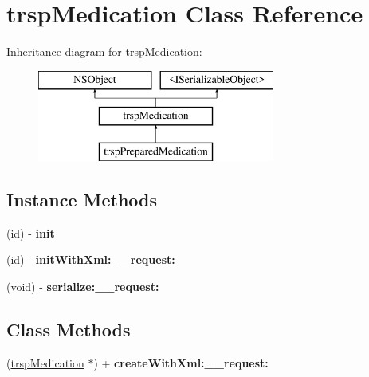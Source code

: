 \hypertarget{interfacetrsp_medication}{}\section{trsp\+Medication Class Reference}
\label{interfacetrsp_medication}
Inheritance diagram for trsp\+Medication\+:\begin{figure}[H]
\begin{center}
\leavevmode
\includegraphics[height=3.000000cm]{interfacetrsp_medication}
\end{center}
\end{figure}
\subsection*{Instance Methods}
\begin{DoxyCompactItemize}
\item 
\hypertarget{interfacetrsp_medication_a001b09d04623ae6089f9107501304768}{}(id) -\/ {\bfseries init}\label{interfacetrsp_medication_a001b09d04623ae6089f9107501304768}

\item 
\hypertarget{interfacetrsp_medication_a208bb2b6a44125dfd5079014d3fc378c}{}(id) -\/ {\bfseries init\+With\+Xml\+:\+\_\+\+\_\+request\+:}\label{interfacetrsp_medication_a208bb2b6a44125dfd5079014d3fc378c}

\item 
\hypertarget{interfacetrsp_medication_a5f7b0268bacae0071af03ba42dc4c098}{}(void) -\/ {\bfseries serialize\+:\+\_\+\+\_\+request\+:}\label{interfacetrsp_medication_a5f7b0268bacae0071af03ba42dc4c098}

\end{DoxyCompactItemize}
\subsection*{Class Methods}
\begin{DoxyCompactItemize}
\item 
\hypertarget{interfacetrsp_medication_aef3126e77cfae34e0db6ef5d29e2fae7}{}(\hyperlink{interfacetrsp_medication}{trsp\+Medication} $\ast$) + {\bfseries create\+With\+Xml\+:\+\_\+\+\_\+request\+:}\label{interfacetrsp_medication_aef3126e77cfae34e0db6ef5d29e2fae7}

\end{DoxyCompactItemize}
